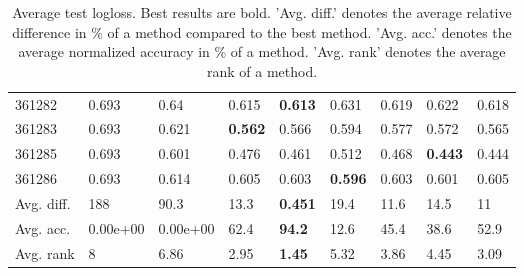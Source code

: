 \begin{table}[ht!]
\begin{tabular}{lllllllll}
  361282 & 0.693 & 0.64 & 0.615 & \textbf{0.613} & 0.631 & 0.619 & 0.622 & 0.618 \\ 
  361283 & 0.693 & 0.621 & \textbf{0.562} & 0.566 & 0.594 & 0.577 & 0.572 & 0.565 \\ 
  361285 & 0.693 & 0.601 & 0.476 & 0.461 & 0.512 & 0.468 & \textbf{0.443} & 0.444 \\ 
  361286 & 0.693 & 0.614 & 0.605 & 0.603 & \textbf{0.596} & 0.603 & 0.601 & 0.605 \\ 
   \hline
Avg. diff. & 188 & 90.3 & 13.3 & \textbf{0.451} & 19.4 & 11.6 & 14.5 & 11 \\ 
  Avg. acc. & 0.00e+00 & 0.00e+00 & 62.4 & \textbf{94.2} & 12.6 & 45.4 & 38.6 & 52.9 \\ 
  Avg. rank & 8 & 6.86 & 2.95 & \textbf{1.45} & 5.32 & 3.86 & 4.45 & 3.09 \\ 
   \hline
\hline
\end{tabular}
\endgroup
\caption{Average test logloss. 
                  Best results are bold. 
                  'Avg. diff.' denotes the average relative difference in \% of a method compared to the best method.
                  'Avg. acc.' denotes the average normalized accuracy in \% of a method.
                  'Avg. rank' denotes the average rank of a method.} 
\label{TABLES/table_results_logloss_random_splits}
\end{table}
